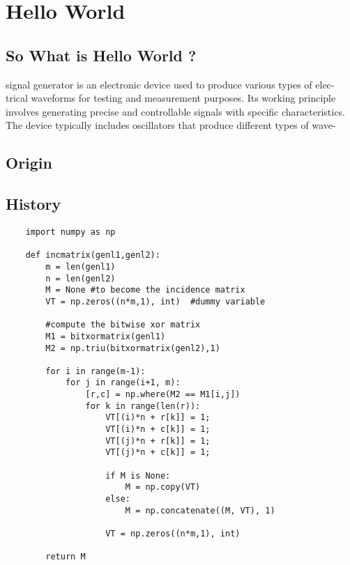 \titlespacing*{\chapter}{0pt}{-15pt}{10pt}
\chapter{Hello World}
\label{exp1}

\section{So What is Hello World ?}
signal generator is an electronic device used to produce various types of elec-
trical waveforms for testing and measurement purposes. Its working principle
involves generating precise and controllable signals with specific characteristics.
The device typically includes oscillators that produce different types of wave-


\section{Origin}
\section{History}
\begin{lstlisting}
    import numpy as np
        
    def incmatrix(genl1,genl2):
        m = len(genl1)
        n = len(genl2)
        M = None #to become the incidence matrix
        VT = np.zeros((n*m,1), int)  #dummy variable
        
        #compute the bitwise xor matrix
        M1 = bitxormatrix(genl1)
        M2 = np.triu(bitxormatrix(genl2),1) 
    
        for i in range(m-1):
            for j in range(i+1, m):
                [r,c] = np.where(M2 == M1[i,j])
                for k in range(len(r)):
                    VT[(i)*n + r[k]] = 1;
                    VT[(i)*n + c[k]] = 1;
                    VT[(j)*n + r[k]] = 1;
                    VT[(j)*n + c[k]] = 1;
                    
                    if M is None:
                        M = np.copy(VT)
                    else:
                        M = np.concatenate((M, VT), 1)
                    
                    VT = np.zeros((n*m,1), int)
        
        return M
    \end{lstlisting}
